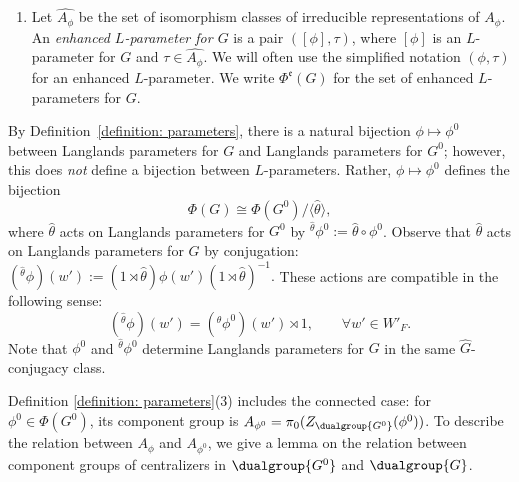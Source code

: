 \documentclass[11pt,letterpaper]{amsart}
\numberwithin{equation}{section}
\begin{document}
\begin{definition}
\begin{enumerate}
 \item Let $\widehat{A_\phi}$ be the set of isomorphism classes of irreducible representations of $A_\phi$.
An {\it enhanced $L$-parameter for $G$} is a pair $([\phi],\tau)$, where $[\phi]$ is an $L$-parameter for $G$ and $\tau\in \widehat{A_\phi}$.
We will often use the simplified notation $(\phi,\tau)$ for an enhanced $L$-parameter.
We write $\Phi^\mathfrak{e}(G)$ for the set of enhanced $L$-parameters for $G$. 
\end{enumerate}
\end{definition}


    By Definition~\ref{definition: parameters}, there is a natural bijection $\phi \mapsto \phi^0$ between Langlands parameters for $G$ and Langlands parameters for $G^0$; however, this does {\it not} define a bijection between $L$-parameters. Rather, $\phi \mapsto \phi^0$ defines the bijection
   \begin{equation}\label{equation: equivalence disconnected g}
        \Phi(G) 
        \cong
    \Phi(G^0)/\langle{\hat\theta}\rangle,
    \end{equation} 
  where ${\hat\theta}$ acts on Langlands parameters for $G^0$ by
${}^{\hat\theta}\phi^0 := {\hat\theta}\circ\phi^0$. Observe that ${\hat\theta}$ acts on Langlands parameters for $G$ by conjugation:
$
({}^{\hat\theta}\phi)(w') := (1\rtimes{\hat\theta})\phi(w')(1\rtimes{\hat\theta})^{-1}.
$
These actions are compatible in the following sense:
\[
({}^{\hat\theta}\phi)(w') = ({}^{\hat\theta}\phi^0)(w') \rtimes 1, 
\qquad \forall w'\in W'_F.
\]
Note that $\phi^0$ and ${}^{\hat\theta}\phi^0$ 
determine Langlands parameters for $G$ in the same $\widehat{G}$-conjugacy class.



Definition \ref{definition: parameters}(3) includes the connected case: for $\phi^0 \in \Phi(G^0)$, its component group is $A_{\phi^0} =  \pi_0(Z_{\dualgroup{G^0}}(\phi^0))$. To describe the relation between $A_{\phi}$ and $A_{\phi^0}$, we give a lemma on the relation between component groups of centralizers in $\dualgroup{G^0}$ and $\dualgroup{G}$. 
\end{document}
